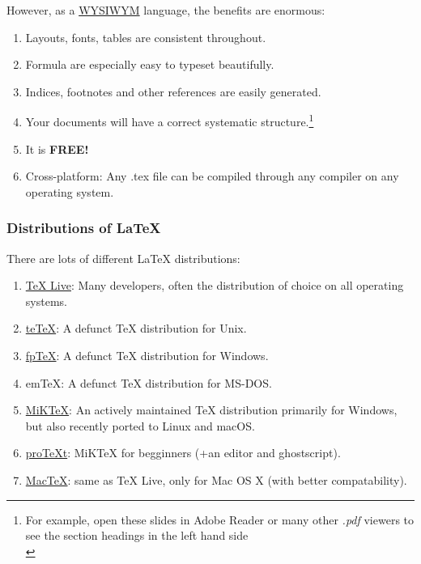 \documentclass[a4paper, 12pt]{article}
\begin{document}
\noindent
However, as a \href{http://en.wikipedia.org/wiki/WYSIWYM}{\color{blue}WYSIWYM} language, the benefits are enormous:

\begin{enumerate}
\item Layouts, fonts, tables are consistent throughout.
\item Formula are especially easy to typeset beautifully.
\item Indices, footnotes and other references are easily generated.
\item Your documents will have a correct systematic structure.\footnote{For example, open these slides in Adobe Reader or many other \emph{.pdf} viewers to see the section headings in the left hand side\\}	%
\item It is \textbf{FREE!} %
\item Cross-platform: Any .tex file can be compiled through any compiler on any operating system.
\end{enumerate}

\subsubsection{Distributions of \LaTeX{}}

There are lots of different \LaTeX{} distributions:

\begin{enumerate}
\item \href{http://tug.org/texlive}{TeX Live}: Many developers, often the distribution of choice on all operating systems.
\item \href{https://www.tug.org/tetex/}{teTeX}: A defunct \TeX{} distribution for Unix.
\item \href{https://ctan.org/pkg/fptex}{fpTeX}: A defunct \TeX{} distribution for Windows.
\item emTeX: A defunct TeX distribution for MS-DOS.
\item \href{http://miktex.org}{MiKTeX}: An actively maintained TeX distribution primarily for Windows, but also recently ported to Linux and macOS.
\item \href{https://www.tug.org/protext/}{proTeXt}: MiKTeX for begginners (+an editor and ghostscript).
\item \href{http://tug.org/mactex}{MacTeX}: same as TeX Live, only for Mac OS X (with better compatability).
\end{enumerate}
\end{document}
